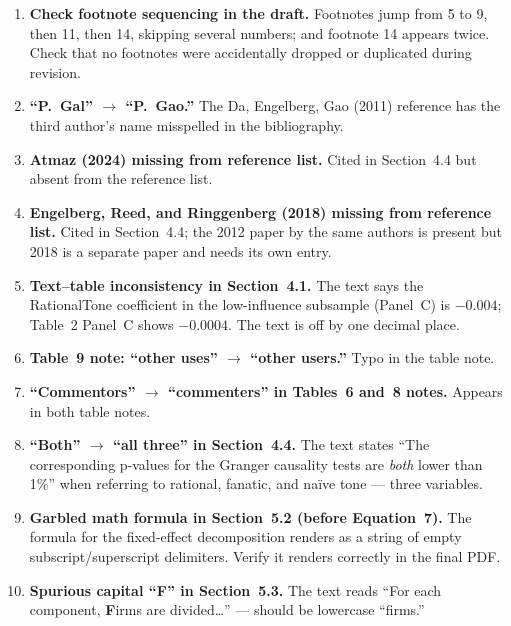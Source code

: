 \documentclass[11pt]{article}
\begin{document}
\begin{enumerate}

  \item \textbf{Check footnote sequencing in the draft.} Footnotes jump
    from 5 to 9, then 11, then 14, skipping several numbers; and footnote
    14 appears twice. Check that no footnotes were accidentally dropped or
    duplicated during revision.

  \item \textbf{``P.\ Gal'' $\to$ ``P.\ Gao.''} The Da, Engelberg, Gao
    (2011) reference has the third author's name misspelled in the
    bibliography.

  \item \textbf{Atmaz (2024) missing from reference list.} Cited in
    Section~4.4 but absent from the reference list.

  \item \textbf{Engelberg, Reed, and Ringgenberg (2018) missing from
    reference list.} Cited in Section~4.4; the 2012 paper by the same
    authors is present but 2018 is a separate paper and needs its own entry.

  \item \textbf{Text--table inconsistency in Section~4.1.} The text says
    the RationalTone coefficient in the low-influence subsample (Panel~C) is
    $-0.004$; Table~2 Panel~C shows $-0.0004$. The text is off by one
    decimal place.

  \item \textbf{Table~9 note: ``other uses'' $\to$ ``other users.''}
    Typo in the table note.

  \item \textbf{``Commentors'' $\to$ ``commenters'' in Tables~6 and~8
    notes.} Appears in both table notes.

  \item \textbf{``Both'' $\to$ ``all three'' in Section~4.4.} The text
    states ``The corresponding p-values for the Granger causality tests are
    \textit{both} lower than 1\%'' when referring to rational, fanatic, and
    na\"{i}ve tone --- three variables.

  \item \textbf{Garbled math formula in Section~5.2 (before Equation~7).}
    The formula for the fixed-effect decomposition renders as a string of
    empty subscript/superscript delimiters. Verify it renders correctly in
    the final PDF.

  \item \textbf{Spurious capital ``F'' in Section~5.3.} The text reads
    ``For each component, \textbf{F}irms are divided\ldots'' --- should be
    lowercase ``firms.''


\end{enumerate}
\end{document}
